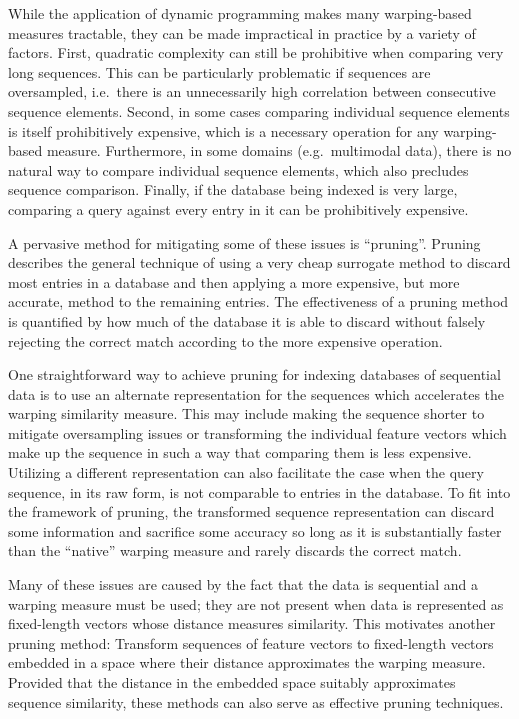While the application of dynamic programming makes many warping-based measures tractable, they can be made impractical in practice by a variety of factors.
First, quadratic complexity can still be prohibitive when comparing very long sequences.
This can be particularly problematic if sequences are oversampled, i.e.\ there is an unnecessarily high correlation between consecutive sequence elements.
Second, in some cases comparing individual sequence elements is itself prohibitively expensive, which is a necessary operation for any warping-based measure.
Furthermore, in some domains (e.g.\ multimodal data), there is no natural way to compare individual sequence elements, which also precludes sequence comparison.
Finally, if the database being indexed is very large, comparing a query against every entry in it can be prohibitively expensive.

A pervasive method for mitigating some of these issues is ``pruning''.
Pruning describes the general technique of using a very cheap surrogate method to discard most entries in a database and then applying a more expensive, but more accurate, method to the remaining entries.
The effectiveness of a pruning method is quantified by how much of the database it is able to discard without falsely rejecting the correct match according to the more expensive operation.

One straightforward way to achieve pruning for indexing databases of sequential data is to use an alternate representation for the sequences which accelerates the warping similarity measure.
This may include making the sequence shorter to mitigate oversampling issues or transforming the individual feature vectors which make up the sequence in such a way that comparing them is less expensive.
Utilizing a different representation can also facilitate the case when the query sequence, in its raw form, is not comparable to entries in the database.
To fit into the framework of pruning, the transformed sequence representation can discard some information and sacrifice some accuracy so long as it is substantially faster than the ``native'' warping measure and rarely discards the correct match.

Many of these issues are caused by the fact that the data is sequential and a warping measure must be used; they are not present when data is represented as fixed-length vectors whose distance measures similarity.
This motivates another pruning method: Transform sequences of feature vectors to fixed-length vectors embedded in a space where their distance approximates the warping measure.
Provided that the distance in the embedded space suitably approximates sequence similarity, these methods can also serve as effective pruning techniques.


